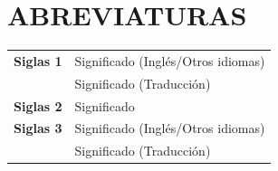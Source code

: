 \documentclass[12pt,oneside]{book} %
\begin{document}
\titlespacing{\chapter}{0pt}{-25pt}{30pt}

\small  \cleardoublepage {}
{}  \tableofcontents %


\cleardoublepage
{}
{} %
\small	\listoffigures %

\cleardoublepage
\small
{}
{} %
\listoftables %

\newpage
\normalsize
	\chapter*{ABREVIATURAS}
	\begin{table}[h]
		\centering
		\begin{tabular}{ll}
	
			\textbf{Siglas 1} & \hspace{1.5cm} Significado (Inglés/Otros idiomas)\\ 
			& \hspace{1.5cm} Significado (Traducción)\\ %
			
			\textbf{Siglas 2} & \hspace{1.5cm} Significado \\
			
			\textbf{Siglas 3} & \hspace{1.5cm} Significado (Inglés/Otros idiomas)\\ 
			& \hspace{1.5cm} Significado (Traducción)\\ %
		\end{tabular}
	\end{table}
	\newpage
	
\end{document}
